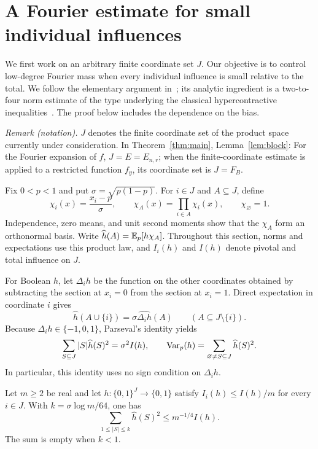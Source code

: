 \section{A Fourier estimate for small individual influences}
\label{sec:fourier}

We first work on an arbitrary finite coordinate set $J$. Our objective
is to control low-degree Fourier mass when every individual influence
is small relative to the total. We follow the elementary argument
in~\cite[Lemma~2.1]{Graph2026}; its analytic ingredient is a
two-to-four norm estimate of the type underlying the classical
hypercontractive inequalities~\cite{Bonami70,Beckner75}.
The proof below includes the dependence on the bias.

\noindent\textit{Remark (notation).} $J$ denotes the finite coordinate set of the product space currently under consideration. In Theorem~\ref{thm:main}, Lemma~\ref{lem:block}: For the Fourier expansion of $f$, $J=E=E_{n,r}$; when the finite-coordinate estimate is applied to a restricted function $f_y$, its coordinate set is $J=F_B$.


Fix $0<p<1$ and put $\sigma=\sqrt{p(1-p)}$. For $i\in J$ and
$A\subseteq J$, define
\[
 \chi_i(x)=\frac{x_i-p}{\sigma},\qquad
 \chi_A(x)=\prod_{i\in A}\chi_i(x),\qquad \chi_\varnothing=1.
\]
Independence, zero means, and unit second moments show that the
$\chi_A$ form an orthonormal basis. Write
$\widehat h(A)=\mathbb E_p[h\chi_A]$.
Throughout this section, norms and expectations use this product law,
and $I_i(h)$ and $I(h)$ denote pivotal and total influence on $J$.

For Boolean $h$, let $\Delta_i h$ be the function on the other
coordinates obtained by subtracting the section at $x_i=0$ from the
section at $x_i=1$. Direct expectation in coordinate $i$ gives
\[
 \widehat h(A\cup\{i\})=
 \sigma\widehat{\Delta_i h}(A)\qquad(A\subseteq J\setminus\{i\}).
\]
Because $\Delta_i h\in\{-1,0,1\}$, Parseval's identity yields
\begin{equation}\label{eq:parseval}
 \sum_{S\subseteq J}|S|\widehat h(S)^2=\sigma^2 I(h),
 \qquad
 \operatorname{Var}_p(h)=\sum_{\varnothing\ne S\subseteq J}\widehat h(S)^2.
\end{equation}
In particular, this identity uses no sign condition on $\Delta_i h$.

\begin{lemma}\label{lem:low}
Let $m\ge2$ be real and let $h:\{0,1\}^J\to\{0,1\}$ satisfy
$I_i(h)\le I(h)/m$ for every $i\in J$. With
$k=\sigma\log m/64$, one has
\begin{equation}\label{eq:low}
 \sum_{1\le |S|\le k}\widehat h(S)^2\le m^{-1/4}I(h).
\end{equation}
The sum is empty when $k<1$.
\end{lemma}

